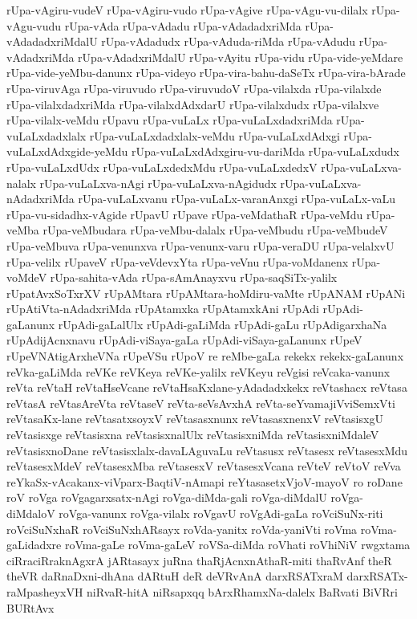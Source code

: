 {rUpa-vAgiru-vudeV
rUpa-vAgiru-vudo
rUpa-vAgive
rUpa-vAgu-vu-dilalx
rUpa-vAgu-vudu
rUpa-vAda
rUpa-vAdadu
rUpa-vAdadadxriMda
rUpa-vAdadadxriMdalU
rUpa-vAdadudx
rUpa-vAduda-riMda
rUpa-vAdudu
rUpa-vAdadxriMda
rUpa-vAdadxriMdalU
rUpa-vAyitu
rUpa-vidu
rUpa-vide-yeMdare
rUpa-vide-yeMbu-danunx
rUpa-videyo
rUpa-vira-bahu-daSeTx
rUpa-vira-bArade
rUpa-viruvAga
rUpa-viruvudo
rUpa-viruvudoV
rUpa-vilalxda
rUpa-vilalxde
rUpa-vilalxdadxriMda
rUpa-vilalxdAdxdarU
rUpa-vilalxdudx
rUpa-vilalxve
rUpa-vilalx-veMdu
rUpavu
rUpa-vuLaLx
rUpa-vuLaLxdadxriMda
rUpa-vuLaLxdadxlalx
rUpa-vuLaLxdadxlalx-veMdu
rUpa-vuLaLxdAdxgi
rUpa-vuLaLxdAdxgide-yeMdu
rUpa-vuLaLxdAdxgiru-vu-dariMda
rUpa-vuLaLxdudx
rUpa-vuLaLxdUdx
rUpa-vuLaLxdedxMdu
rUpa-vuLaLxdedxV
rUpa-vuLaLxva-nalalx
rUpa-vuLaLxva-nAgi
rUpa-vuLaLxva-nAgidudx
rUpa-vuLaLxva-nAdadxriMda
rUpa-vuLaLxvanu
rUpa-vuLaLx-varanAnxgi
rUpa-vuLaLx-vaLu
rUpa-vu-sidadhx-vAgide
rUpavU
rUpave
rUpa-veMdathaR
rUpa-veMdu
rUpa-veMba
rUpa-veMbudara
rUpa-veMbu-dalalx
rUpa-veMbudu
rUpa-veMbudeV
rUpa-veMbuva
rUpa-venunxva
rUpa-venunx-varu
rUpa-veraDU
rUpa-velalxvU
rUpa-velilx
rUpaveV
rUpa-veVdevxYta
rUpa-veVnu
rUpa-voMdanenx
rUpa-voMdeV
rUpa-sahita-vAda
rUpa-sAmAnayxvu
rUpa-saqSiTx-yalilx
rUpatAvxSoTxrXV
rUpAMtara
rUpAMtara-hoMdiru-vaMte
rUpANAM
rUpANi
rUpAtiVta-nAdadxriMda
rUpAtamxka
rUpAtamxkAni
rUpAdi
rUpAdi-gaLanunx
rUpAdi-gaLalUlx
rUpAdi-gaLiMda
rUpAdi-gaLu
rUpAdigarxhaNa
rUpAdijAcnxnavu
rUpAdi-viSaya-gaLa
rUpAdi-viSaya-gaLanunx
rUpeV
rUpeVNAtigArxheVNa
rUpeVSu
rUpoV
re
reMbe-gaLa
rekekx
rekekx-gaLanunx
reVka-gaLiMda
reVKe
reVKeya
reVKe-yalilx
reVKeyu
reVgisi
reVcaka-vanunx
reVta
reVtaH
reVtaHseVcane
reVtaHsaKxlane-yAdadadxkekx
reVtashacx
reVtasa
reVtasA
reVtasAreVta
reVtaseV
reVta-seVsAvxhA
reVta-seYvamajiVviSemxVti
reVtasaKx-lane
reVtasatxsoyxV
reVtasasxnunx
reVtasasxnenxV
reVtasisxgU
reVtasisxge
reVtasisxna
reVtasisxnalUlx
reVtasisxniMda
reVtasisxniMdaleV
reVtasisxnoDane
reVtasisxlalx-davaLAguvaLu
reVtasusx
reVtasesx
reVtasesxMdu
reVtasesxMdeV
reVtasesxMba
reVtasesxV
reVtasesxVcana
reVteV
reVtoV
reVva
reYkaSx-vAcakanx-viVparx-BaqtiV-nAmapi
reYtasasetxVjoV-mayoV
ro
roDane
roV
roVga
roVgagarxsatx-nAgi
roVga-diMda-gali
roVga-diMdalU
roVga-diMdaloV
roVga-vanunx
roVga-vilalx
roVgavU
roVgAdi-gaLa
roVciSuNx-riti
roVciSuNxhaR
roVciSuNxhARsayx
roVda-yanitx
roVda-yaniVti
roVma
roVma-gaLidadxre
roVma-gaLe
roVma-gaLeV
roVSa-diMda
roVhati
roVhiNiV
rwgxtama
ciRraciRraknAgxrA
jARtasayx
juRna
thaRjAcnxnAthaR-miti
thaRvAnf
theR
theVR
daRnaDxni-dhAna
dARtuH
deR
deVRvAnA
darxRSATxraM
darxRSATx-raMpasheyxVH
niRvaR-hitA
niRsapxqq
bArxRhamxNa-dalelx
BaRvati
BiVRri
BURtAvx
}
